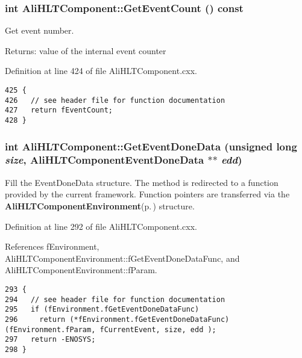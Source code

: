 \subsubsection{\setlength{\rightskip}{0pt plus 5cm}int Ali\-HLTComponent::Get\-Event\-Count () const\hspace{0.3cm}{\tt  [protected]}}\label{classAliHLTComponent_b11}


Get event number. \begin{Desc}
\item[Returns:]value of the internal event counter \end{Desc}


Definition at line 424 of file Ali\-HLTComponent.cxx.

\footnotesize\begin{verbatim}425 {
426   // see header file for function documentation
427   return fEventCount;
428 }
\end{verbatim}\normalsize 


\subsubsection{\setlength{\rightskip}{0pt plus 5cm}int Ali\-HLTComponent::Get\-Event\-Done\-Data (unsigned long {\em size}, {\bf Ali\-HLTComponent\-Event\-Done\-Data} $\ast$$\ast$ {\em edd})\hspace{0.3cm}{\tt  [protected]}}\label{classAliHLTComponent_b9}


Fill the Event\-Done\-Data structure. The method is redirected to a function provided by the current framework. Function pointers are transferred via the {\bf Ali\-HLTComponent\-Environment}{\rm (p.\,\pageref{structAliHLTComponentEnvironment})} structure. 

Definition at line 292 of file Ali\-HLTComponent.cxx.

References f\-Environment, Ali\-HLTComponent\-Environment::f\-Get\-Event\-Done\-Data\-Func, and Ali\-HLTComponent\-Environment::f\-Param.

\footnotesize\begin{verbatim}293 {
294   // see header file for function documentation
295   if (fEnvironment.fGetEventDoneDataFunc)
296     return (*fEnvironment.fGetEventDoneDataFunc)(fEnvironment.fParam, fCurrentEvent, size, edd );
297   return -ENOSYS;
298 }
\end{verbatim}\normalsize 


